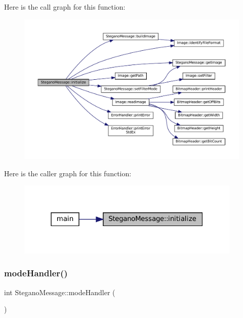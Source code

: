 Here is the call graph for this function\+:\nopagebreak
\begin{figure}[H]
\begin{center}
\leavevmode
\includegraphics[width=350pt]{classSteganoMessage_aeb4d2b69498c148508e2ca70194679cc_cgraph}
\end{center}
\end{figure}
Here is the caller graph for this function\+:\nopagebreak
\begin{figure}[H]
\begin{center}
\leavevmode
\includegraphics[width=304pt]{classSteganoMessage_aeb4d2b69498c148508e2ca70194679cc_icgraph}
\end{center}
\end{figure}
\mbox{\label{classSteganoMessage_a2649e515941e730520b759282d00dcd6}} 
\subsubsection{\texorpdfstring{modeHandler()}{modeHandler()}}
{\footnotesize\ttfamily int Stegano\+Message\+::mode\+Handler (\begin{DoxyParamCaption}{ }\end{DoxyParamCaption})}



